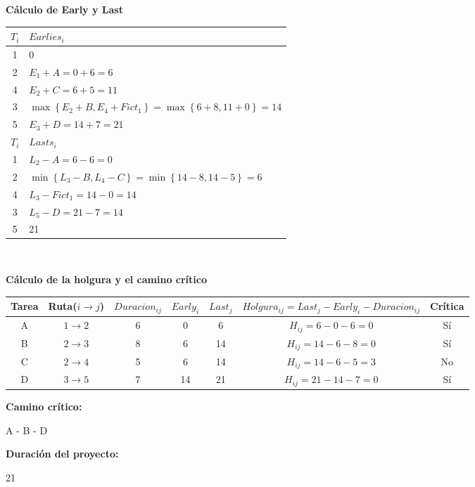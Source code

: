 \documentclass{llncs}
\begin{document}
\textbf{Cálculo de Early y Last}
\begin{table}
\label{tab:tabla2}
\centering
\begin{tabular}{C|l}
\toprule
$T_i$ & $Earlies_i$ \\
 & 0 \\
 & $E_1 + A = 0 + 6 = 6$ \\
 & $E_2 + C = 6 + 5 = 11$ \\
 & $\max \left\{ E_2 + B, E_4 + Fict_1 \right\} = \max \left\{ 6 + 8, 11 + 0 \right\} = 14$ \\
 & $E_3 + D = 14 + 7 = 21$ \\
\bottomrule
\toprule
$T_i$ & $Lasts_i$ \\
 & $L_2 - A = 6 - 6 = 0$ \\
 & $\min \left\{ L_3 - B, L_4 - C \right\} = \min \left\{ 14 - 8, 14 - 5 \right\} = 6$ \\
 & $L_3 - Fict_1 = 14 - 0 = 14$ \\
 & $L_5 - D = 21 - 7 = 14$ \\
 & 21 \\
\bottomrule
\end{tabular}
\end{table} \\

\newpage

\textbf{Cálculo de la holgura y el camino crítico}
\begin{table}
\label{tab:tabla3}
\centering
\begin{tabular}{C|CCCCcC}
\toprule
Tarea & Ruta($i \rightarrow j$) & $Duracion_{ij}$ & $Early_i$ & $Last_j$ & $Holgura_{ij} = Last_j - Early_i - Duracion_{ij}$ & Crítica \\
\midrule
A & $1 \rightarrow 2$ & 6 & 0 & 6 & $H_{ij} = 6 - 0 - 6 = 0$ & Sí \\
B & $2 \rightarrow 3$ & 8 & 6 & 14 & $H_{ij} = 14 - 6 - 8 = 0$ & Sí \\
C & $2 \rightarrow 4$ & 5 & 6 & 14 & $H_{ij} = 14 - 6 - 5 = 3$ & No \\
D & $3 \rightarrow 5$ & 7 & 14 & 21 & $H_{ij} = 21 - 14 - 7 = 0$ & Sí \\
\bottomrule
\end{tabular}
\end{table}

\begin{multicols}{2}
\textbf{Camino crítico:}

A - B - D

\textbf{Duración del proyecto:}

21
\end{multicols}
\end{document}
